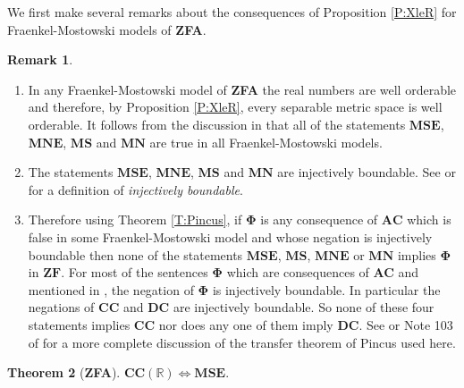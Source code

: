 \documentclass[11pt, reqno]{amsart}
\theoremstyle{definition}
\newtheorem{theorem}{Theorem}
\numberwithin{theorem}{section}
\theoremstyle{definition}
\newtheorem{remark}[theorem]{Remark}
\theoremstyle{definition}
\theoremstyle{definition}
\theoremstyle{definition}
\theoremstyle{definition}
\numberwithin{claim}{section}
\theoremstyle{definition}
\theoremstyle{definition}
\theoremstyle{definition}
\theoremstyle{definition}
\theoremstyle{definition}
\theoremstyle{remboldstyle}
\begin{document}
We first make several remarks about the consequences of Proposition \ref{P:XleR} for  Fraenkel-Mostowski models of \textbf{ZFA}.
\begin{remark} \label{R:FMmodels} \leavevmode
\begin{enumerate}
\item \label{I:M_InFM} In any Fraenkel-Mostowski model of \textbf{ZFA} the real numbers are well orderable and therefore, by Proposition \ref{P:XleR}, every separable metric space is well orderable.  It follows from the discussion in \cite[Section 4.2]{Jech} that all of the statements $\mathbf{MSE}$, $\mathbf{MNE}$, $\mathbf{MS}$ and $\mathbf{MN}$ are true in all Fraenkel-Mostowski models.
\item \label{I:M_Trans} The statements $\mathbf{MSE}$, $\mathbf{MNE}$, $\mathbf{MS}$ and $\mathbf{MN}$ are injectively boundable.  See \cite[Note 103]{HR} or \cite{Pincus} for a definition of \emph{injectively boundable}.
\item Therefore using Theorem \ref{T:Pincus}, if $\mathbf{\Phi}$ is any consequence of $\mathbf{AC}$ which is false in some Fraenkel-Mostowski model and whose negation is injectively boundable then none of the statements $\mathbf{MSE}$, $\mathbf{MS}$, $\mathbf{MNE}$ or $\mathbf{MN}$ implies $\mathbf{\Phi}$ in $\mathbf{ZF}$.  For most of the sentences $\mathbf{\Phi}$ which are consequences of \textbf{AC} and mentioned in \cite{HR}, the negation of $\mathbf{\Phi}$ is injectively boundable.  In particular the negations of $\mathbf{CC}$ and $\mathbf{DC}$ are injectively boundable.  So none of these four statements implies $\mathbf{CC}$ nor does any one of them imply $\mathbf{DC}$.  See \cite[Theorem 4]{PincusADC} or Note 103 of \cite{HR} for a more complete discussion of the transfer theorem of Pincus used here.
\end{enumerate}
\end{remark}


\begin{theorem}[\textbf{ZFA}]\label{MSEonR}
$\mathbf{CC}(\mathbb{R}) \iff \mathbf{MSE}$.
\end{theorem}
\end{document}
